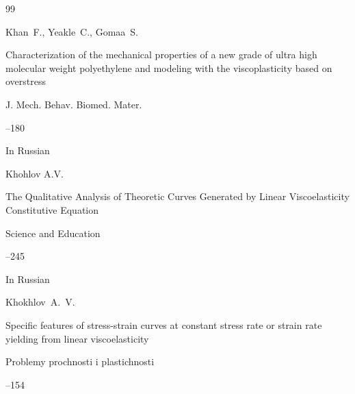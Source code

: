 \begin{thebibliography}{99}

\by Khan~F., Yeakle~C., Gomaa~S.

\paper Characterization of the mechanical properties of a new grade of ultra high molecular weight polyethylene and modeling with the viscoplasticity based on overstress

\jour J. Mech. Behav. Biomed. Mater.




--180







\lang In Russian

\by  Khohlov A.V.

\paper The Qualitative Analysis of Theoretic Curves Generated by Linear Viscoelasticity Constitutive Equation

\jour Science and Education



--245







\lang In Russian

\by Khokhlov~A.~V.

\paper Specific features of stress-strain curves at constant stress rate or strain rate yielding from linear viscoelasticity

\jour Problemy prochnosti i plastichnosti




--154







\end{thebibliography}



%

